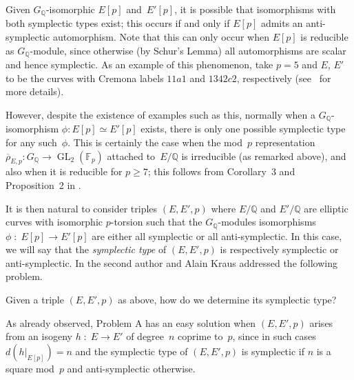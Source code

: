 \documentclass[12pt]{amsart}
\newcommand{\F}{\mathbb{F}}
\newcommand{\Q}{\mathbb{Q}}
\newcommand{\Z}{\mathbb{Z}}
\newcommand{\rhobar}{{\overline{\rho}}}
\newcommand{\GL}{\operatorname{GL}}
\numberwithin{equation}{section}
\theoremstyle{definition}
\theoremstyle{remark}
\begin{document}
Given $G_\Q$-isomorphic $E[p]$ and~$E'[p]$, it is possible that
isomorphisms with both symplectic types exist; this occurs if and only
if $E[p]$ admits an anti-symplectic automorphism.  Note that this can
only occur when $E[p]$ is reducible as $G_{\Q}$-module, since
otherwise (by Schur's Lemma) all automorphisms are scalar and hence
symplectic.  As an example of this phenomenon, take $p=5$ and $E$, $E'$
to be the curves with Cremona labels $11a1$ and $1342c2$, respectively (see~\cite[Example~5.2]{FKSym} for more details). 
\begin{comment}
both have $5$-torsion Galois module isomorphic to $\mu_5
\times \Z/5\Z$.  Now let $P,Q \in E[5]$ and $P',Q' \in E'[5]$ be bases
such that $P$, $P'$ are defined over~$\Q$.  The map defined by $P
\mapsto P'$ and $Q \mapsto n\cdot Q'$ (with $5 \nmid n$) is a
$G_\Q$-isomorphism which is symplectic if and only if $n$ is a square
mod~$5$.  Moreover, the automorphism $\alpha$ of $E[5]$ given by
$\alpha(P) = P$ and $\alpha(Q) = 2Q$ is anti-symplectic because $2$ is
not a square modulo~$5$.
\end{comment}
However, despite the existence of examples such as this, normally when
a $G_\Q$-isomorphism $\phi : E[p] \simeq E'[p]$ exists, there is only
one possible symplectic type for any such~$\phi$.  This is certainly
the case when the mod~$p$ representation $\rhobar_{E,p} : G_\Q \to
\GL_2(\F_p)$ attached to~$E/\Q$ is irreducible (as remarked above),
and also when it is reducible for $p \geq 7$; this follows from
Corollary~3 and Proposition~2 in \cite{FKSym}.

It is then natural to consider triples $(E,E',p)$ where $E/\Q$ and
$E'/\Q$ are elliptic curves with isomorphic $p$-torsion such that the
$G_\Q$-modules isomorphisms $\phi \; : \; E[p] \rightarrow E'[p]$ are
either all symplectic or all anti-symplectic.  In this case, we will
say that the {\it symplectic type} of $(E,E',p)$ is respectively
symplectic or anti-symplectic.  In \cite{FKSym} the second author and
Alain Kraus addressed the following problem.

Given a triple $(E,E',p)$ as above, how do we determine its symplectic type?

As already observed, Problem A has an easy solution when $(E,E',p)$
arises from an isogeny $h \; \colon \; E \to E'$ of degree~$n$ coprime
to~$p$, since in such cases $d(h|_{E[p]}) = n$ and the symplectic type
of $(E,E',p)$ is symplectic if $n$ is a square mod~$p$ and
anti-symplectic otherwise.
\end{document}
